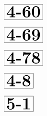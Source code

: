 \documentclass[a4paper, 10pt]{article}
\begin{document}
\thispagestyle{empty}
\begin{minipage}[t]{0.15\textwidth}
                \vspace*{-3.5cm}
        \hspace*{0.75cm}
        $\boxed{\textbf{\Huge4-60}}$
\end{minipage}
\begin{minipage}[t]{0.85\textwidth}
    
\end{minipage}

\begin{minipage}[t]{0.15\textwidth}
                \vspace*{-3.5cm}
        \hspace*{0.75cm}
        $\boxed{\textbf{\Huge4-69}}$
\end{minipage}
\begin{minipage}[t]{0.85\textwidth}
    
\end{minipage}

\begin{minipage}[t]{0.15\textwidth}
                \vspace*{-3.5cm}
        \hspace*{0.75cm}
        $\boxed{\textbf{\Huge4-78}}$
\end{minipage}
\begin{minipage}[t]{0.85\textwidth}
    
\end{minipage}

\begin{minipage}[t]{0.15\textwidth}
                \vspace*{-3.5cm}
        \hspace*{1.25cm}
        $\boxed{\textbf{\Huge4-8}}$
\end{minipage}
\begin{minipage}[t]{0.85\textwidth}
    
\end{minipage}

\begin{minipage}[t]{0.15\textwidth}
                \vspace*{-3.5cm}
        \hspace*{1.25cm}
        $\boxed{\textbf{\Huge5-1}}$
\end{minipage}
\begin{minipage}[t]{0.85\textwidth}
    
\end{minipage}
\end{document}
